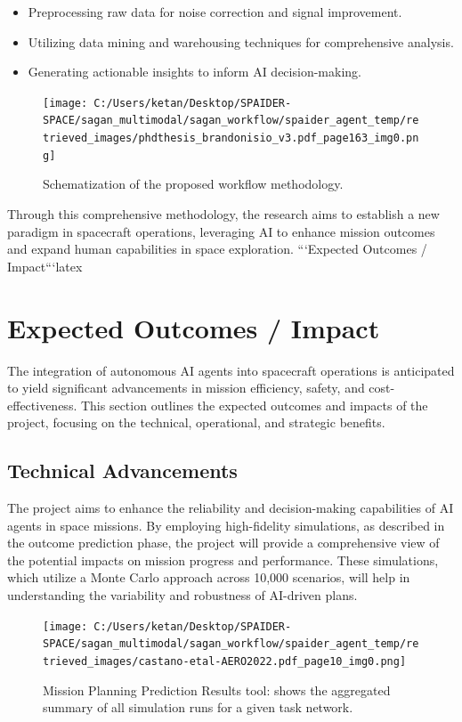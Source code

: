 \documentclass[a4paper, 11pt]{article}
\begin{document}
\begin{itemize}
    \item Preprocessing raw data for noise correction and signal improvement.
    \item Utilizing data mining and warehousing techniques for comprehensive analysis.
    \item Generating actionable insights to inform AI decision-making.
\end{itemize}

\begin{figure}[htbp]
    \centering
    \texttt{[image: C:/Users/ketan/Desktop/SPAIDER-SPACE/sagan\_multimodal/sagan\_workflow/spaider\_agent\_temp/retrieved\_images/phdthesis\_brandonisio\_v3.pdf\_page163\_img0.png]}
    \caption{Schematization of the proposed workflow methodology.}
    \label{fig:workflow-methodology}
\end{figure}

Through this comprehensive methodology, the research aims to establish a new paradigm in spacecraft operations, leveraging AI to enhance mission outcomes and expand human capabilities in space exploration.
```Expected Outcomes / Impact```latex
\section{Expected Outcomes / Impact}

The integration of autonomous AI agents into spacecraft operations is anticipated to yield significant advancements in mission efficiency, safety, and cost-effectiveness. This section outlines the expected outcomes and impacts of the project, focusing on the technical, operational, and strategic benefits.

\subsection{Technical Advancements}

The project aims to enhance the reliability and decision-making capabilities of AI agents in space missions. By employing high-fidelity simulations, as described in the outcome prediction phase, the project will provide a comprehensive view of the potential impacts on mission progress and performance. These simulations, which utilize a Monte Carlo approach across 10,000 scenarios, will help in understanding the variability and robustness of AI-driven plans.

\begin{figure}[htbp]
    \centering
    \texttt{[image: C:/Users/ketan/Desktop/SPAIDER-SPACE/sagan\_multimodal/sagan\_workflow/spaider\_agent\_temp/retrieved\_images/castano-etal-AERO2022.pdf\_page10\_img0.png]}
    \caption{Mission Planning Prediction Results tool: shows the aggregated summary of all simulation runs for a given task network.}
    \label{fig:mission-planning-prediction}
\end{figure}
\end{document}
